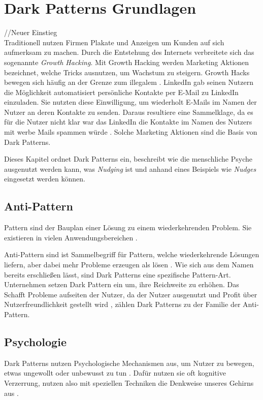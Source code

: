 \documentclass[conference,compsoc,final,a4paper]{IEEEtran}
\begin{document}
\section{Dark Patterns Grundlagen}
//Neuer Einstieg\\

Traditionell nutzen Firmen Plakate und Anzeigen um Kunden auf sich aufmerksam zu machen. Durch die Entstehung des Internets verbreitete sich das sogenannte \textit{Growth Hacking}. Mit Growth Hacking werden Marketing Aktionen bezeichnet, welche Tricks ausnutzen, um Wachstum zu steigern. Growth Hacks bewegen sich häufig an der Grenze zum illegalem  \autocite{Narayanan2020}. LinkedIn gab seinen Nutzern die Möglichkeit automatisiert persönliche Kontakte per E-Mail zu LinkedIn einzuladen. Sie nutzten diese Einwilligung, um wiederholt E-Mails im Namen der Nutzer an deren Kontakte zu senden. Daraus resultiere eine Sammelklage, da es für die Nutzer nicht klar war das LinkedIn die Kontakte im Namen des Nutzers mit werbe Mails spammen würde \autocite{Strange2015}. Solche Marketing Aktionen sind die Basis von Dark Patterns. 

Dieses Kapitel ordnet Dark Patterns ein, beschreibt wie die menschliche Psyche ausgenutzt werden kann, was \textit{Nudging} ist und anhand eines Beispiels wie \textit{Nudges} eingesetzt werden können.
\subsection{Anti-Pattern}
Pattern sind der Bauplan einer Lösung zu einem wiederkehrenden Problem. Sie existieren in vielen Anwendungsbereichen \autocite[S. 1]{MacDonald2019}.

Anti-Pattern sind ist Sammelbegriff für Pattern, welche wiederkehrende Lösungen liefern, aber dabei mehr Probleme erzeugen als lösen \autocite[S. 193-195]{MacDonald2019}. Wie sich aus dem Namen bereits erschließen lässt, sind Dark Patterns eine spezifische Pattern-Art.
Unternehmen setzen Dark Pattern ein um, ihre Reichweite zu erhöhen. Das Schafft Probleme aufseiten der Nutzer, da der Nutzer ausgenutzt und Profit über Nutzerfreundlichkeit gestellt wird \autocite{Chivukula_2019}, zählen Dark Patterns zu der Familie der Anti-Pattern.
\subsection{Psychologie}
\label{chap:Psychologie}
Dark Patterns nutzen Psychologische Mechanismen aus, um Nutzer zu bewegen, etwas ungewollt oder unbewusst zu tun \autocite{Brignull}. Dafür nutzen sie oft kognitive Verzerrung, nutzen also mit speziellen Techniken die Denkweise unseres Gehirns aus \autocite{Mathur2019}.
\end{document}
